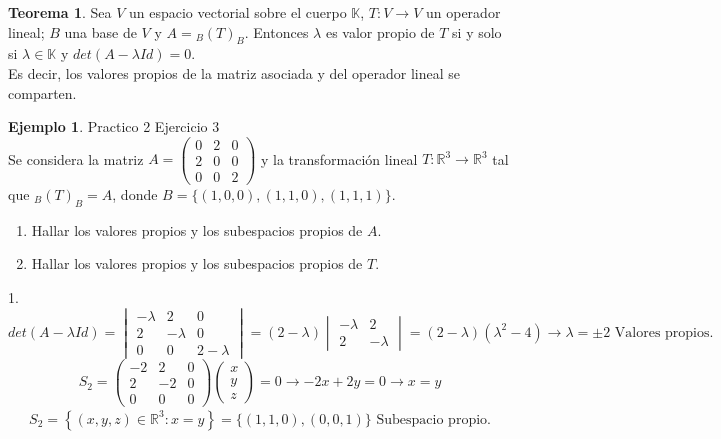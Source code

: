 \documentclass[10pt]{article}
\theoremstyle{definition}
\newtheorem{theorem}{Teorema}[section]
\newtheorem{example}{Ejemplo}[section]
\begin{document}
\begin{theorem}
	Sea $V$ un espacio vectorial sobre el cuerpo $\mathbb{K}$, $T:V\to V$ un operador lineal; $B$ una base de $V$ y $A={}_B(T)_B$. Entonces $\lambda$ es valor propio de $T$ si y solo si $\lambda\in\mathbb{K}$ y $det\left(A-\lambda Id  \right)=0$.
	\\Es decir, los valores propios de la matriz asociada y del operador lineal se comparten.
\end{theorem}\newpage
\begin{example}{Practico 2 Ejercicio 3}
	\\Se considera la matriz $A=\begin{pmatrix} 0 & 2 & 0 \\ 2 & 0 & 0 \\ 0 & 0 & 2 \end{pmatrix} $ y la transformación lineal $T:\mathbb{R} ^3 \to\mathbb{R} ^3$ tal que $_B(T)_B=A$, donde $B=\{(1,0,0),(1,1,0),(1,1,1)\}$.
	\begin{enumerate}
		\item Hallar los valores propios y los subespacios propios de $A$.
		\item Hallar los valores propios y los subespacios propios de $T$.
	\end{enumerate}
	1. $$det\left( A-\lambda Id \right)=\begin{vmatrix}
			-\lambda & 2        & 0         \\
			2        & -\lambda & 0         \\
			0        & 0        & 2-\lambda
		\end{vmatrix} =( 2-\lambda )\begin{vmatrix}
			-\lambda & 2        \\
			2        & -\lambda
		\end{vmatrix} =( 2-\lambda )\left( \lambda ^{2} -4\right)\rightarrow \lambda =\pm 2 \text{ Valores propios.}$$
	$$S_{2} =\begin{pmatrix}
			-2 & 2  & 0 \\
			2  & -2 & 0 \\
			0  & 0  & 0
		\end{pmatrix}\begin{pmatrix}
			x \\
			y \\
			z
		\end{pmatrix} =0\rightarrow -2x+2y=0\rightarrow x=y$$
	$$ \begin{array}{l}
			S_{2} =\left\{( x,y,z) \in \mathbb{R}^{3}  : x=y\right\}=\{(1,1,0),(0,0,1)\} \text{ Subespacio propio.} \\

\end{array}$$
\end{example}
\end{document}
